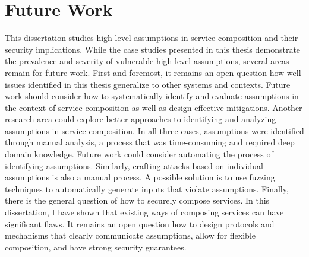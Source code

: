 \section{Future Work}
This dissertation studies high-level assumptions in service composition and their security implications. While the case studies presented in this thesis demonstrate the prevalence and severity of vulnerable high-level assumptions, several areas remain for future work. First and foremost, it remains an open question how well issues identified in this thesis generalize to other systems and contexts. Future work should consider how to systematically identify and evaluate assumptions in the context of service composition as well as design effective mitigations.
Another research area could explore better approaches to identifying and analyzing assumptions in service composition. In all three cases, assumptions were identified through manual analysis, a process that was time-consuming and required deep domain knowledge. Future work could consider automating the process of identifying assumptions. Similarly, crafting attacks based on individual assumptions is also a manual process. A possible solution is to use fuzzing techniques to automatically generate inputs that violate assumptions. Finally, there is the general question of how to securely compose services. In this dissertation, I have shown that existing ways of composing services can have significant flaws. It remains an open question how to design protocols and mechanisms that clearly communicate assumptions, allow for flexible composition, and have strong security guarantees.

